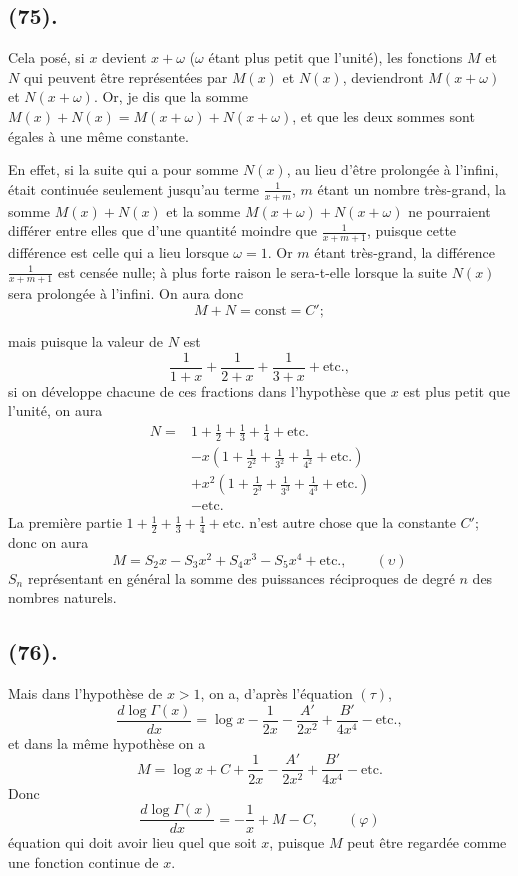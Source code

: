 \documentclass{article}
\begin{document}
\subsection*{(75).}

Cela posé, si $x$ devient $x+\omega$ ($\omega$ étant plus petit que l'unité), les fonctions $M$ et $N$ qui peuvent être représentées par $M(x)$ et $N(x)$, deviendront $M(x+\omega)$ et $N(x+\omega)$. Or, je dis que la somme $M(x)+N(x)=M(x+\omega)+N(x+\omega)$, et que les deux sommes sont égales à une même constante.

En effet, si la suite qui a pour somme $N(x)$, au lieu d'être prolongée à l'infini, était continuée seulement jusqu'au terme $\frac{1}{x+m}$, $m$ étant un nombre très-grand, la somme $M(x)+N(x)$ et la somme $M(x+\omega)+N(x+\omega)$ ne pourraient différer entre elles que d'une quantité moindre que $\frac{1}{x+m+1}$, puisque cette différence est celle qui a lieu lorsque $\omega=1$. Or $m$ étant très-grand, la différence $\frac{1}{x+m+1}$ est censée nulle; à plus forte raison le sera-t-elle lorsque la suite $N(x)$ sera prolongée à l'infini. On aura donc
\[ M+N=\text{const}=C'; \]

mais puisque la valeur de $N$ est
\[ \frac{1}{1+x}+\frac{1}{2+x}+\frac{1}{3+x}+\text{etc.}, \]
si on développe chacune de ces fractions dans l'hypothèse que $x$ est plus petit que l'unité, on aura
\[ \begin{aligned} N={}&1+\tfrac{1}{2}+\tfrac{1}{3}+\tfrac{1}{4}+\text{etc.}\\ &-x\left(1+\frac{1}{2^{2}}+\frac{1}{3^{2}}+\frac{1}{4^{2}}+\text{etc.}\right)\\ &+x^{2}\left(1+\frac{1}{2^{3}}+\frac{1}{3^{3}}+\frac{1}{4^{3}}+\text{etc.}\right)\\ &-\text{etc.} \end{aligned} \]
La première partie $1+\frac{1}{2}+\frac{1}{3}+\frac{1}{4}+\text{etc.}$ n'est autre chose que la constante $C'$; donc on aura
\[ M=S_{2}x-S_{3}x^{2}+S_{4}x^{3}-S_{5}x^{4}+\text{etc.},\qquad(\upsilon) \]
$S_{n}$ représentant en général la somme des puissances réciproques de degré $n$ des nombres naturels.

\subsection*{(76).}

Mais dans l'hypothèse de $x>1$, on a, d'après l'équation $(\tau)$,
\[ \frac{d\log\Gamma(x)}{dx}=\log x-\frac{1}{2x}-\frac{A'}{2x^{2}}+\frac{B'}{4x^{4}}-\text{etc.}, \]
et dans la même hypothèse on a
\[ M=\log x+C+\frac{1}{2x}-\frac{A'}{2x^{2}}+\frac{B'}{4x^{4}}-\text{etc.} \]
Donc
\[ \frac{d\log\Gamma(x)}{dx}=-\frac{1}{x}+M-C,\qquad(\varphi) \]
équation qui doit avoir lieu quel que soit $x$, puisque $M$ peut être regardée comme une fonction continue de $x$.
\end{document}
